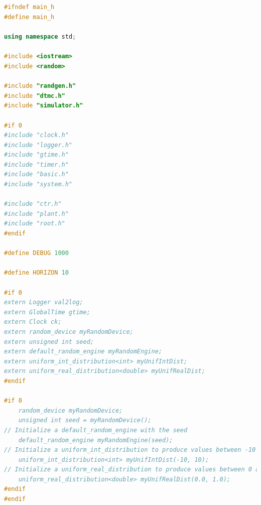 \documentclass[10pt, letterpaper]{report}
\begin{document}
\subsection{}
\begin{lstlisting}[style=CppStyle,language=C++]
#ifndef main_h
#define main_h
    
using namespace std;
    
#include <iostream>
#include <random>
    
#include "randgen.h"
#include "dtmc.h"
#include "simulator.h"
    
#if 0
#include "clock.h"
#include "logger.h"
#include "gtime.h"
#include "timer.h"
#include "basic.h"
#include "system.h"
    
#include "ctr.h"
#include "plant.h"
#include "root.h"
#endif
     
#define DEBUG 1000
    
#define HORIZON 10
    
#if 0
extern Logger val2log;
extern GlobalTime gtime;
extern Clock ck;
extern random_device myRandomDevice;
extern unsigned int seed;
extern default_random_engine myRandomEngine;
extern uniform_int_distribution<int> myUnifIntDist;
extern uniform_real_distribution<double> myUnifRealDist;
#endif
    
#if 0
    random_device myRandomDevice;
    unsigned int seed = myRandomDevice();  
// Initialize a default_random_engine with the seed
    default_random_engine myRandomEngine(seed);
// Initialize a uniform_int_distribution to produce values between -10 and 10
    uniform_int_distribution<int> myUnifIntDist(-10, 10);
// Initialize a uniform_real_distribution to produce values between 0 and 1
    uniform_real_distribution<double> myUnifRealDist(0.0, 1.0);
#endif 
#endif
\end{lstlisting}

\newpage 
\end{document}
